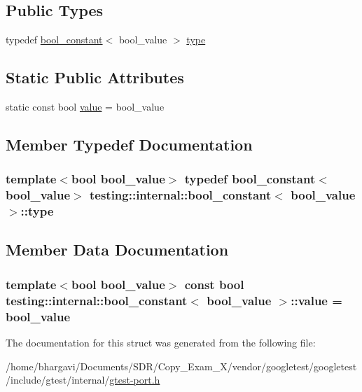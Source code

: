 \subsection*{Public Types}
\begin{DoxyCompactItemize}
\item 
typedef \hyperlink{structtesting_1_1internal_1_1bool__constant}{bool\+\_\+constant}$<$ bool\+\_\+value $>$ \hyperlink{structtesting_1_1internal_1_1bool__constant_aba6d09ecf7eecea6c93480f0d627a167}{type}
\end{DoxyCompactItemize}
\subsection*{Static Public Attributes}
\begin{DoxyCompactItemize}
\item 
static const bool \hyperlink{structtesting_1_1internal_1_1bool__constant_a499fba6576296b04d99690a486424b32}{value} = bool\+\_\+value
\end{DoxyCompactItemize}


\subsection{Member Typedef Documentation}
\subsubsection[{\texorpdfstring{type}{type}}]{\setlength{\rightskip}{0pt plus 5cm}template$<$bool bool\+\_\+value$>$ typedef {\bf bool\+\_\+constant}$<$bool\+\_\+value$>$ {\bf testing\+::internal\+::bool\+\_\+constant}$<$ bool\+\_\+value $>$\+::{\bf type}}\hypertarget{structtesting_1_1internal_1_1bool__constant_aba6d09ecf7eecea6c93480f0d627a167}{}\label{structtesting_1_1internal_1_1bool__constant_aba6d09ecf7eecea6c93480f0d627a167}


\subsection{Member Data Documentation}
\subsubsection[{\texorpdfstring{value}{value}}]{\setlength{\rightskip}{0pt plus 5cm}template$<$bool bool\+\_\+value$>$ const bool {\bf testing\+::internal\+::bool\+\_\+constant}$<$ bool\+\_\+value $>$\+::value = bool\+\_\+value\hspace{0.3cm}{\ttfamily [static]}}\hypertarget{structtesting_1_1internal_1_1bool__constant_a499fba6576296b04d99690a486424b32}{}\label{structtesting_1_1internal_1_1bool__constant_a499fba6576296b04d99690a486424b32}


The documentation for this struct was generated from the following file\+:\begin{DoxyCompactItemize}
\item 
/home/bhargavi/\+Documents/\+S\+D\+R/\+Copy\+\_\+\+Exam\+\_\+X/vendor/googletest/googletest/include/gtest/internal/\hyperlink{gtest-port_8h}{gtest-\/port.\+h}\end{DoxyCompactItemize}
